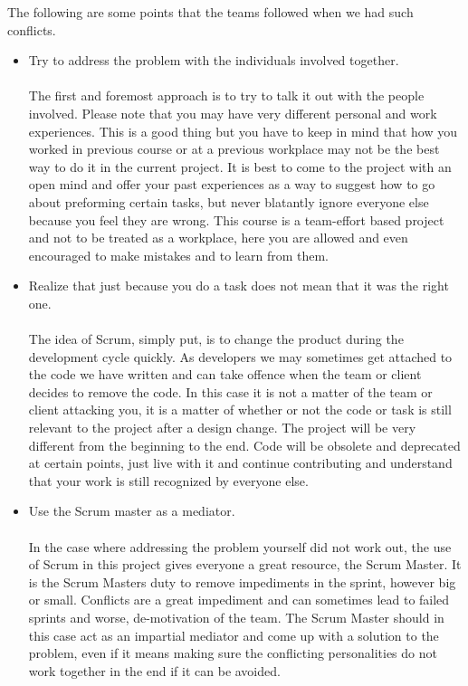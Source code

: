 The following are some points that the teams followed when we had such conflicts.
\begin{itemize}
\item Try to address the problem with the individuals involved together.\\ \\
The first and foremost approach is to try to talk it out with the people involved. Please note that you may have very different personal and work experiences. This is a good thing but you have to keep in mind that how you worked in previous course or at a previous workplace may not be the best way to do it in the current project. It is best to come to the project with an open mind and offer your past experiences as a way to suggest how to go about preforming certain tasks, but never blatantly ignore everyone else because you feel they are wrong. This course is a team-effort based project and not to be treated as a workplace, here you are allowed and even encouraged to make mistakes and to learn from them.

\item Realize that just because you do a task does not mean that it was the right one.\\ \\
The idea of Scrum, simply put, is to change the product during the development cycle quickly. As developers we may sometimes get attached to the code we have written and can take offence when the team or client decides to remove the code. In this case it is not a matter of the team or client attacking you, it is a matter of whether or not the code or task is still relevant to the project after a design change. The project will be very different from the beginning to the end. Code will be obsolete and deprecated at certain points, just live with it and continue contributing and understand that your work is still recognized by everyone else.
 \\
\item Use the Scrum master as a mediator.\\ \\
In the case where addressing the problem yourself did not work out, the use of Scrum in this project gives everyone a great resource, the Scrum Master. It is the Scrum Masters duty to remove impediments in the sprint, however big or small. Conflicts are a great impediment and can sometimes lead to failed sprints and worse, de-motivation of the team. The Scrum Master should in this case act as an impartial mediator and come up with a solution to the problem, even if it means making sure the conflicting personalities do not work together in the end if it can be avoided.

\end{itemize}
